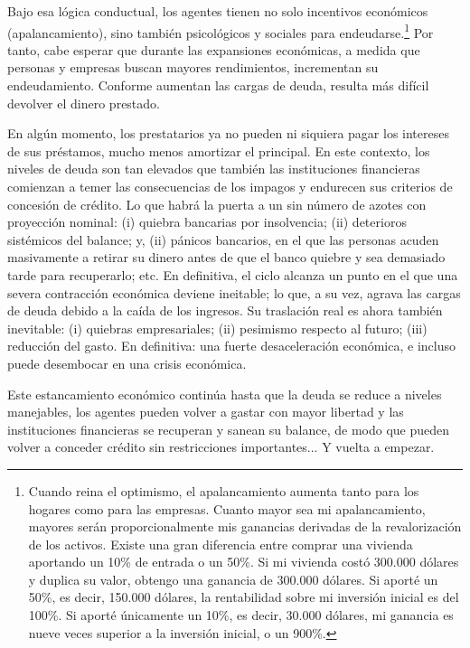 \documentclass[10pt,a4paper]{article}
\begin{document}
Bajo esa lógica conductual, los agentes tienen no solo incentivos económicos (apalancamiento), sino también psicológicos y sociales para endeudarse.\footnote{%
    Cuando reina el optimismo, el apalancamiento aumenta tanto para los hogares como para las empresas. Cuanto mayor sea mi apalancamiento, mayores serán proporcionalmente mis ganancias derivadas de la revalorización de los activos. Existe una gran diferencia entre comprar una vivienda aportando un 10\% de entrada o un 50\%. Si mi vivienda costó 300.000 dólares y duplica su valor, obtengo una ganancia de 300.000 dólares. Si aporté un 50\%, es decir, 150.000 dólares, la rentabilidad sobre mi inversión inicial es del 100\%. Si aporté únicamente un 10\%, es decir, 30.000 dólares, mi ganancia es nueve veces superior a la inversión inicial, o un 900\%.
} Por tanto, cabe esperar que durante las expansiones económicas, a medida que personas y empresas buscan mayores rendimientos, incrementan su endeudamiento. Conforme aumentan las cargas de deuda, resulta más difícil devolver el dinero prestado. 

En algún momento, los prestatarios ya no pueden ni siquiera pagar los intereses de sus préstamos, mucho menos amortizar el principal. En este contexto, los niveles de deuda son tan elevados que también las instituciones financieras comienzan a temer las consecuencias de los impagos y endurecen sus criterios de concesión de crédito. Lo que habrá la puerta a un sin número de azotes con proyección nominal: (i) quiebra bancarias por insolvencia; (ii) deterioros sistémicos del balance; y, (ii) pánicos bancarios, en el que las personas acuden masivamente a retirar su dinero antes de que el banco quiebre y sea demasiado tarde para recuperarlo; etc. En definitiva, el ciclo alcanza un punto en el que una severa contracción económica deviene ineitable; lo que, a su vez, agrava las cargas de deuda debido a la caída de los ingresos. Su traslación real es ahora también inevitable: (i) quiebras empresariales; (ii) pesimismo respecto al futuro; (iii) reducción del gasto. En definitiva: una fuerte desaceleración económica, e incluso puede desembocar en una crisis económica. 

Este estancamiento económico continúa hasta que la deuda se reduce a niveles manejables, los agentes pueden volver a gastar con mayor libertad y las instituciones financieras se recuperan y sanean su balance, de modo que pueden volver a conceder crédito sin restricciones importantes... Y vuelta a empezar.
\end{document}
